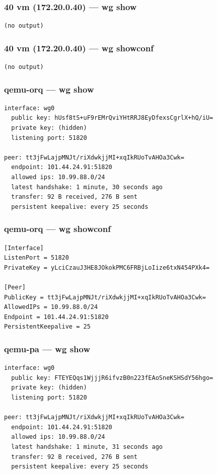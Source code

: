 \documentclass[11pt,a4paper]{article}
\begin{document}
\subsubsection*{40 vm (172.20.0.40) — wg show}
\begin{lstlisting}
(no output)
\end{lstlisting}

\subsubsection*{40 vm (172.20.0.40) — wg showconf}
\begin{lstlisting}
(no output)
\end{lstlisting}

\subsubsection*{qemu-orq — wg show}
\begin{lstlisting}
interface: wg0
  public key: hUsf8tS+uF9rEMrQviYHtRRJ8EyDfexsCgrlX+hQ/iU=
  private key: (hidden)
  listening port: 51820

peer: tt3jFwLajpMNJt/riXdwkjjMI+xqIkRUoTvAHOa3Cwk=
  endpoint: 101.44.24.91:51820
  allowed ips: 10.99.88.0/24
  latest handshake: 1 minute, 30 seconds ago
  transfer: 92 B received, 276 B sent
  persistent keepalive: every 25 seconds

\end{lstlisting}

\subsubsection*{qemu-orq — wg showconf}
\begin{lstlisting}
[Interface]
ListenPort = 51820
PrivateKey = yLciCzauJ3HE8JOkokPMC6FRBjLoIize6txN454PXk4=

[Peer]
PublicKey = tt3jFwLajpMNJt/riXdwkjjMI+xqIkRUoTvAHOa3Cwk=
AllowedIPs = 10.99.88.0/24
Endpoint = 101.44.24.91:51820
PersistentKeepalive = 25

\end{lstlisting}

\subsubsection*{qemu-pa — wg show}
\begin{lstlisting}
interface: wg0
  public key: FTEYEQqs1WjjjR6ifvzB0n223fEAoSneKSHSdY56hgo=
  private key: (hidden)
  listening port: 51820

peer: tt3jFwLajpMNJt/riXdwkjjMI+xqIkRUoTvAHOa3Cwk=
  endpoint: 101.44.24.91:51820
  allowed ips: 10.99.88.0/24
  latest handshake: 1 minute, 31 seconds ago
  transfer: 92 B received, 276 B sent
  persistent keepalive: every 25 seconds

\end{lstlisting}
\end{document}
